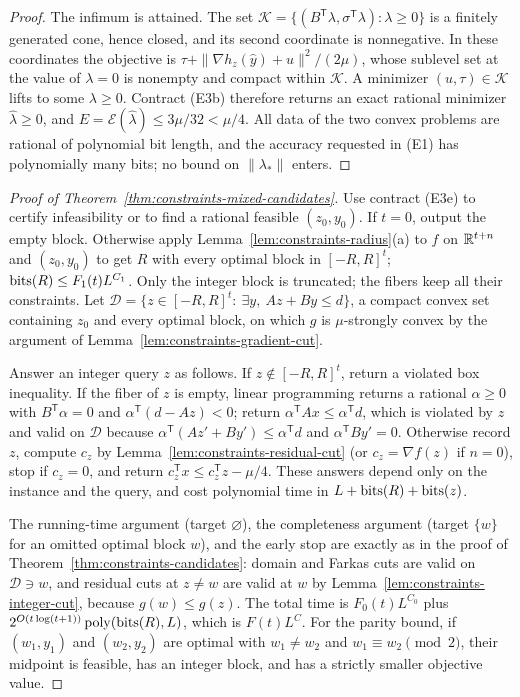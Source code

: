 \begin{proof}
The infimum is attained. The set
$\mathcal K=\{(B^{\mathsf T}\lambda,\sigma^{\mathsf T}\lambda):\lambda\ge0\}$ is a
finitely generated cone, hence closed, and its second coordinate is nonnegative.
In these coordinates the objective is $\tau+\|\nabla h_z(\hat y)+u\|^2/(2\mu)$,
whose sublevel set at the value of $\lambda=0$ is nonempty and compact within
$\mathcal K$. A minimizer $(u,\tau)\in\mathcal K$ lifts to some $\lambda\ge0$.
Contract (E3b) therefore returns an exact rational minimizer $\hat\lambda\ge0$,
and $E=\mathcal E(\hat\lambda)\le3\mu/32<\mu/4$. All data of the two convex
problems are rational of polynomial bit length, and the accuracy requested in
(E1) has polynomially many bits; no bound on $\|\lambda_*\|$ enters.
\end{proof}

\begin{proof}[Proof of Theorem~\ref{thm:constraints-mixed-candidates}]
Use contract (E3e) to certify infeasibility or to find a rational feasible
$(z_0,y_0)$. If $t=0$, output the empty block. Otherwise apply
Lemma~\ref{lem:constraints-radius}(a) to $f$ on $\mathbb R^{t+n}$ and $(z_0,y_0)$ to
get $R$ with every optimal block in $[-R,R]^t$; $\operatorname{bits}(R)\le F_1(t)L^{C_1}$.
Only the integer block is truncated; the fibers keep all their constraints.
Let $\mathcal D=\{z\in[-R,R]^t:\ \exists y,\ Az+By\le d\}$, a compact convex
set containing $z_0$ and every optimal block, on which $g$ is $\mu$-strongly
convex by the argument of Lemma~\ref{lem:constraints-gradient-cut}.

Answer an integer query $z$ as follows. If $z\notin[-R,R]^t$, return a
violated box inequality. If the fiber of $z$ is empty, linear programming
returns a rational $\alpha\ge0$ with $B^{\mathsf T}\alpha=0$ and
$\alpha^{\mathsf T}(d-Az)<0$; return $\alpha^{\mathsf T}Ax\le\alpha^{\mathsf T}d$,
which is violated by $z$ and valid on $\mathcal D$ because
$\alpha^{\mathsf T}(Az'+By')\le\alpha^{\mathsf T}d$ and
$\alpha^{\mathsf T}By'=0$. Otherwise record $z$, compute $c_z$ by
Lemma~\ref{lem:constraints-residual-cut} (or $c_z=\nabla f(z)$ if $n=0$), stop
if $c_z=0$, and return $c_z^{\mathsf T}x\le c_z^{\mathsf T}z-\mu/4$. These
answers depend only on the instance and the query, and cost polynomial time in
$L+\operatorname{bits}(R)+\operatorname{bits}(z)$.

The running-time argument (target $\varnothing$), the completeness argument
(target $\{w\}$ for an omitted optimal block $w$), and the early stop are
exactly as in the proof of Theorem~\ref{thm:constraints-candidates}: domain and
Farkas cuts are valid on $\mathcal D\ni w$, and residual cuts at $z\ne w$ are
valid at $w$ by Lemma~\ref{lem:constraints-integer-cut}, because
$g(w)\le g(z)$. The total time is $F_0(t)L^{C_0}$ plus
$2^{O(t\log(t+1))}\operatorname{poly}(\operatorname{bits}(R),L)$, which is $F(t)L^{C}$. For the parity
bound, if $(w_1,y_1)$ and $(w_2,y_2)$ are optimal with $w_1\ne w_2$ and
$w_1\equiv w_2\pmod 2$, their midpoint is feasible, has an integer block, and
has a strictly smaller objective value.
\end{proof}


